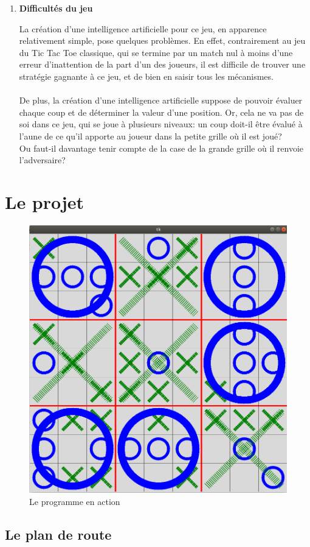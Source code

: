 \documentclass[10pt, french]{article}
\begin{document}
\begin{enumerate}
\item \textbf{Difficultés du jeu}

\par La création d'une intelligence artificielle pour ce jeu, en apparence relativement simple, pose quelques problèmes. 
En effet, contrairement au jeu du Tic Tac Toe classique, qui se termine par un match nul à moins d'une erreur d'inattention de la part d'un des joueurs, il est difficile de trouver une stratégie gagnante à ce jeu, et de bien en saisir tous les mécanismes.
\paragraph{}
De plus, la création d'une intelligence artificielle suppose de pouvoir évaluer chaque coup et de déterminer la valeur d'une position. Or, cela ne va pas de soi dans ce jeu, qui se joue à plusieurs niveaux: un coup doit-il être évalué à l'aune de ce qu'il apporte au joueur dans la petite grille où il est joué? \\
Ou faut-il davantage tenir compte de la case de la grande grille où il renvoie l'adversaire? 


\end{enumerate}

\paragraph{}
\section{Le projet}
\begin{figure}
\centering
\includegraphics[width=.5\textwidth]{interface}
\caption{Le programme en action}
\end{figure}
\subsection{Le plan de route}
\end{document}
